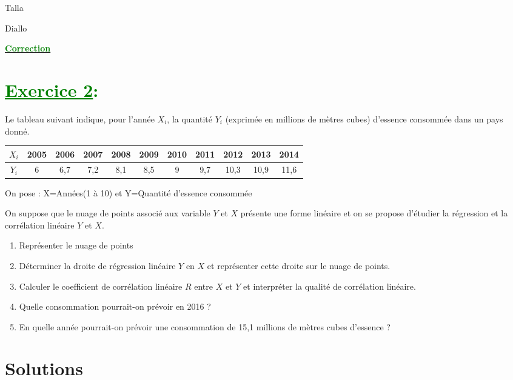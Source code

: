 \documentclass[12pt]{article}
\begin{document}
\begin{minipage}{0.8\textwidth}
	Talla                        
\end{minipage}
\begin{minipage}{0.8\textwidth}
	Diallo 
\end{minipage}

\begin{center}
\textbf{{\underline{\textcolor{green}{Correction}}}}
\end{center}
\section*{\textcolor{green}{\underline{Exercice 2}:}}

Le tableau suivant indique, pour l'année \(X_i\), la quantité \(Y_i\) (exprimée en millions de mètres cubes) d'essence consommée dans un pays donné.

\begin{tabular}{|c|c|c|c|c|c|c|c|c|c|c|}
  \hline
  $X_{i}$ & 2005 & 2006 & 2007 & 2008 & 2009 & 2010 & 2011 & 2012 & 2013 & 2014 \\
  \hline
  $Y_{i}$ & 6 & 6,7 & 7,2 & 8,1 & 8,5 & 9 & 9,7 & 10,3 & 10,9 & 11,6 \\
  \hline
\end{tabular}
On pose : X=Années(1 à 10) et Y=Quantité d'essence consommée

On suppose que le nuage de points associé aux variable \(Y\) et \(X\) présente une forme linéaire et on se propose d'étudier la régression et la corrélation linéaire \(Y\) et \(X\).
\begin{enumerate}
  \item Représenter le nuage de points
  \item Déterminer la droite de régression linéaire \(Y\) en \(X\) et représenter cette droite sur le nuage de points.
  \item Calculer le coefficient de corrélation linéaire \(R\) entre \(X\) et \(Y\) et interpréter la qualité de corrélation linéaire.
  \item Quelle consommation pourrait-on prévoir en 2016 ?
  \item En quelle année pourrait-on prévoir une consommation de 15,1 millions de mètres cubes d'essence ?
\end{enumerate}
\section*{Solutions}
\end{document}
